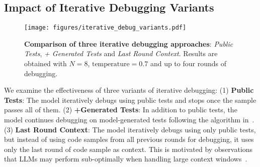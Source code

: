 



\subsection{Impact of Iterative Debugging Variants}
\label{ssect:ablation_selfdebug}
\begin{figure}[h]
    \centering
    \texttt{[image: figures/iterative\_debug\_variants.pdf]}
    \caption{\textbf{Comparison of three iterative debugging approaches}: \textit{Public Tests},  \textit{+ Generated Tests}  and \textit{Last Round Context}. Results are obtained with \(N=8\), \(\text{temperature}=0.7\) and up to four rounds of debugging.}
    \label{fig:iterative_debug_performance}
    \vspace{-5mm}
\end{figure}
We examine the effectiveness of three variants of iterative debugging: (1) \textbf{Public Tests}: The model iteratively debugs using public tests and stops once the sample passes all of them. (2) \textbf{+Generated Tests}: In addition to public tests, the model continues debugging on model-generated tests following the algorithm in~\citep{ridnik2024code}. (3) \textbf{Last Round Context}: The model iteratively debugs using only public tests, but instead of using code samples from all previous rounds for debugging, it uses only the last round of code sample as context. This is motivated by observations that LLMs may perform sub-optimally when handling large context windows~\citep{liu2024lost}.


